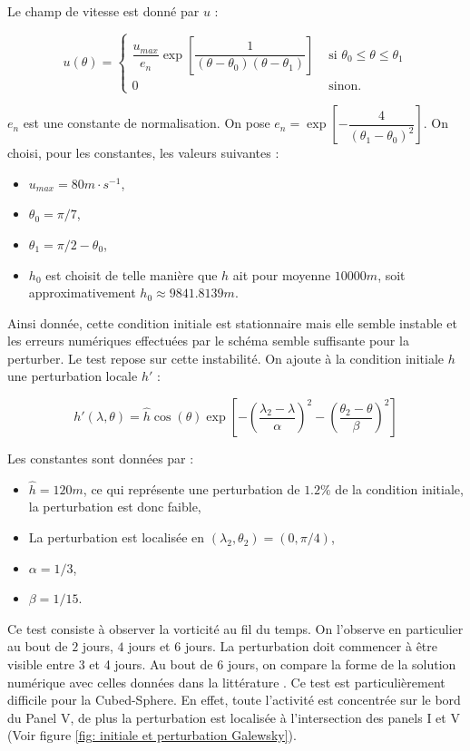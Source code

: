 Le champ de vitesse est donné par $u$ :

\begin{equation}
u(\theta) = \left\lbrace
\begin{array}{ll}
\dfrac{u_{max}}{e_n} \exp \left[ \dfrac{1}{(\theta-\theta_0)(\theta-\theta_1)} \right] & \text{ si } \theta_0 \leq \theta \leq \theta_1 \\
0 & \text{ sinon.}
\end{array}
\right.
\end{equation}

$e_n$ est une constante de normalisation. On pose $e_n = \exp\left[ - \dfrac{4}{(\theta_1-\theta_0)^2} \right]$. On choisi, pour les constantes, les valeurs suivantes :
\begin{itemize}
\item $u_{max}=80 m \cdot s^{-1}$,
\item $\theta_0 = \pi/7$,
\item $\theta_1 = \pi/2 - \theta_0$,
\item $h_0$ est choisit de telle manière que $h$ ait pour moyenne $10000 m$, soit approximativement $h_0 \approx 9841.8139 m$.
\end{itemize}

Ainsi donnée, cette condition initiale est stationnaire mais elle semble instable et les erreurs numériques effectuées par le schéma semble suffisante pour la perturber. Le test repose sur cette instabilité. On ajoute à la condition initiale $h$ une perturbation locale $h'$ :

\begin{equation}
h'(\lambda, \theta) = \hat{h} \cos ( \theta ) \exp \left[ - \left( \dfrac{\lambda_2 - \lambda}{\alpha} \right)^2 - \left( \dfrac{\theta_2 - \theta}{\beta} \right)^2 \right]
\end{equation}

Les constantes sont données par :
\begin{itemize}
\item $\hat{h} = 120m$, ce qui représente une perturbation de $1.2 \%$ de la condition initiale, la perturbation est donc faible,
\item La perturbation est localisée en $(\lambda_2, \theta_2) = (0, \pi/4)$,
\item $\alpha = 1/3$,
\item $\beta = 1/15$.
\end{itemize}

Ce test consiste à observer la vorticité au fil du temps. On l'observe en particulier au bout de $2$ jours, $4$ jours et $6$ jours. La perturbation doit commencer à être visible entre 3 et 4 jours. Au bout de 6 jours, on compare la forme de la solution numérique avec celles données dans la littérature \cite{Galewsky2004, Chen2008}. Ce test est particulièrement difficile pour la Cubed-Sphere. En effet, toute l'activité est concentrée sur le bord du Panel V, de plus la perturbation est localisée à l'intersection des panels I et V (Voir figure \ref{fig: initiale et perturbation Galewsky}).

